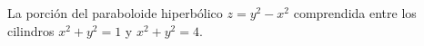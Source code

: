 \item La porción del paraboloide hiperbólico $z = y^2 - x^2$ comprendida entre los cilindros $x^2 + y^2 = 1$ y $x^2 + y^2 = 4$.
